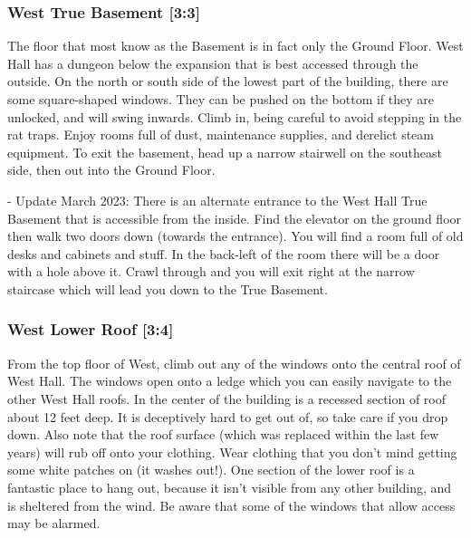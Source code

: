 \documentclass{article}
\begin{document}
\subsubsection{West True Basement [3:3]}
The floor that most know as the Basement is in fact only the Ground Floor. West Hall has a dungeon below the expansion that is best accessed through the outside. On the north or south side of the lowest part of the building, there are some square-shaped windows. They can be pushed on the bottom if they are unlocked, and will swing inwards. Climb in, being careful to avoid stepping in the rat traps. Enjoy rooms full of dust, maintenance supplies, and derelict steam equipment. To exit the basement, head up a narrow stairwell on the southeast side, then out into the Ground Floor.

- Update March 2023: There is an alternate entrance to the West Hall True Basement that is accessible from the inside. Find the elevator on the ground floor then walk two doors down (towards the entrance). You will find a room full of old desks and cabinets and stuff. In the back-left of the room there will be a door with a hole above it. Crawl through and you will exit right at the narrow staircase which will lead you down to the True Basement.

\subsubsection{West Lower Roof [3:4]}
From the top floor of West, climb out any of the windows onto the central roof of West Hall. The windows open onto a ledge which you can easily navigate to the other West Hall roofs. In the center of the building is a recessed section of roof about 12 feet deep. It is deceptively hard to get out of, so take care if you drop down. Also note that the roof surface (which was replaced within the last few years) will rub off onto your clothing. Wear clothing that you don’t mind getting some white patches on (it washes out!). One section of the lower roof is a fantastic place to hang out, because it isn’t visible from any other building, and is sheltered from the wind. Be aware that some of the windows that allow access may be alarmed.
\end{document}
